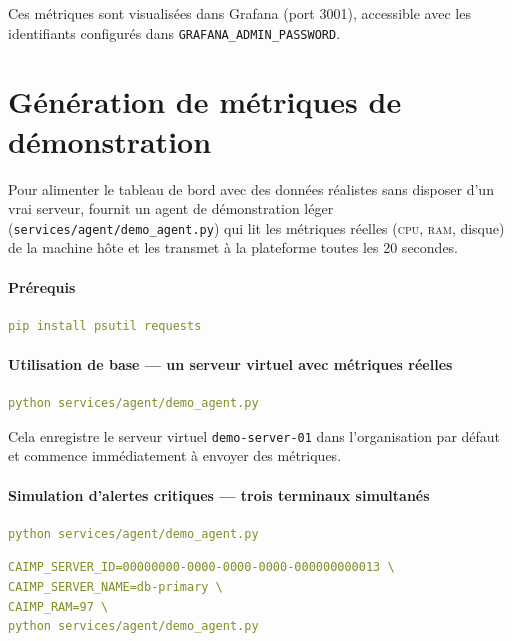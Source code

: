 Ces métriques sont visualisées dans Grafana (port 3001), accessible avec les
identifiants configurés dans \texttt{GRAFANA\_ADMIN\_PASSWORD}.

\section{Génération de métriques de démonstration}

Pour alimenter le tableau de bord avec des données réalistes sans disposer d'un
vrai serveur, \caimp{} fournit un agent de démonstration léger
(\texttt{services/agent/demo\_agent.py}) qui lit les métriques réelles
(\textsc{cpu}, \textsc{ram}, disque) de la machine hôte et les transmet à la
plateforme toutes les 20 secondes.

\paragraph{Prérequis}
\begin{lstlisting}[language=YAML]
pip install psutil requests
\end{lstlisting}

\paragraph{Utilisation de base — un serveur virtuel avec métriques réelles}
\begin{lstlisting}[language=YAML]
python services/agent/demo_agent.py
\end{lstlisting}

\noindent Cela enregistre le serveur virtuel \texttt{demo-server-01} dans
l'organisation par défaut et commence immédiatement à envoyer des métriques.

\paragraph{Simulation d'alertes critiques — trois terminaux simultanés}

\begin{lstlisting}[language=YAML, caption={Terminal 1 — métriques réelles de la machine}]
python services/agent/demo_agent.py
\end{lstlisting}

\begin{lstlisting}[language=YAML, caption={Terminal 2 — db-primary avec RAM critique}]
CAIMP_SERVER_ID=00000000-0000-0000-0000-000000000013 \
CAIMP_SERVER_NAME=db-primary \
CAIMP_RAM=97 \
python services/agent/demo_agent.py
\end{lstlisting}

